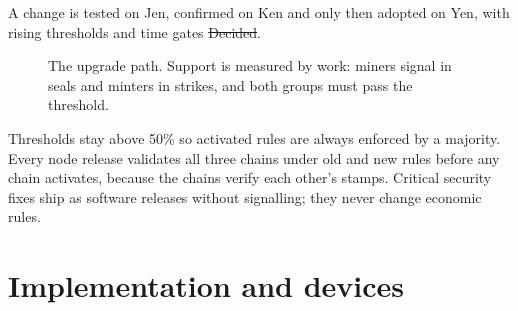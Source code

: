 A change is tested on Jen, confirmed on Ken and only then adopted on Yen, with rising thresholds and time gates \st{Decided}.

\begin{figure}[htbp]
\centering
{}
\caption{The upgrade path. Support is measured by work: miners signal in seals and minters in strikes, and both groups must pass the threshold.}
\end{figure}

Thresholds stay above 50\% so activated rules are always enforced by a majority. Every node release validates all three chains under old and new rules before any chain activates, because the chains verify each other's stamps. Critical security fixes ship as software releases without signalling; they never change economic rules.

\section{Implementation and devices}\label{sec:impl}

